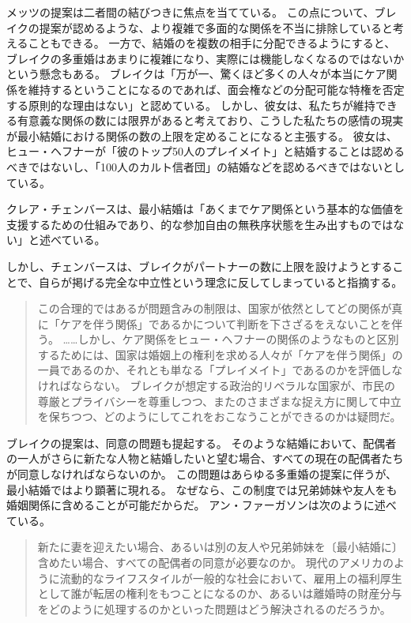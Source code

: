 \documentclass[paper=a4,book,openany]{jlreq}
\newcommand{\ig}[1]{}           %
\begin{document}
メッツの提案は二者間の結びつきに焦点を当てている。
この点について、ブレイクの提案が認めるような、より複雑で多面的な関係を不当に排除していると考えることもできる。
一方で、結婚のを複数の相手に分配できるようにすると、ブレイクの多重婚はあまりに複雑になり、実際には機能しなくなるのではないかという懸念もある。
ブレイクは「万が一、驚くほど多くの人々が本当にケア関係を維持するということになるのであれば、面会権などの分配可能な特権を否定する原則的な理由はない」と認めている\citep[p.140]{brake12:_minim_marriag}。
しかし、彼女は、私たちが維持できる有意義な関係の数には限界があると考えており、こうした私たちの感情の現実が最小結婚における関係の数の上限を定めることになると主張する。
彼女は、ヒュー・ヘフナーが「彼のトップ50人のプレイメイト」と結婚することは認めるべきではないし、「100人のカルト信者団」の結婚などを認めるべきではないとしている\citep[p.164]{brake12:_minim_marriag}。

クレア・チェンバースは、最小結婚は「あくまでケア関係という基本的な価値を支援するための仕組みであり、的な参加自由の無秩序状態を生み出すものではない」と述べている\citep[p.96]{chambers17:againstmarriage}。
\ig{Clare chmbers}
しかし、チェンバースは、ブレイクがパートナーの数に上限を設けようとすることで、自らが掲げる完全な中立性という理念に反してしまっていると指摘する。

\begin{quote}
この合理的ではあるが問題含みの制限は、国家が依然としてどの関係が真に「ケアを伴う関係」であるかについて判断を下さざるをえないことを伴う。
……しかし、ケア関係をヒュー・ヘフナーの関係のようなものと区別するためには、国家は婚姻上の権利を求める人々が「ケアを伴う関係」の一員であるのか、それとも単なる「プレイメイト」であるのかを評価しなければならない。
ブレイクが想定する政治的リベラルな国家が、市民の尊厳とプライバシーを尊重しつつ、またのさまざまな捉え方に関して中立を保ちつつ、どのようにしてこれをおこなうことができるのかは疑問だ。
\citep[p.96]{chambers17:againstmarriage}\ig{Clare chmbers}
\end{quote}

ブレイクの提案は、同意の問題も提起する。
そのような結婚において、配偶者の一人がさらに新たな人物と結婚したいと望む場合、すべての現在の配偶者たちが同意しなければならないのか。
この問題はあらゆる多重婚の提案に伴うが、最小結婚ではより顕著に現れる。
なぜなら、この制度では兄弟姉妹や友人をも婚姻関係に含めることが可能だからだ。
アン・ファーガソンは次のように述べている。

\begin{quote}
新たに妻を迎えたい場合、あるいは別の友人や兄弟姉妹を〔最小結婚に〕含めたい場合、すべての配偶者の同意が必要なのか。
現代のアメリカのように流動的なライフスタイルが一般的な社会において、雇用上の福利厚生として誰が転居の権利をもつことになるのか、あるいは離婚時の財産分与をどのように処理するのかといった問題はどう解決されるのだろうか。
\citep{ferguson14:_review_brake}
\end{quote}
\end{document}
